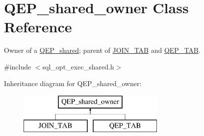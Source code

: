 \hypertarget{classQEP__shared__owner}{}\section{Q\+E\+P\+\_\+shared\+\_\+owner Class Reference}
\label{classQEP__shared__owner}


Owner of a \mbox{\hyperlink{classQEP__shared}{Q\+E\+P\+\_\+shared}}; parent of \mbox{\hyperlink{classJOIN__TAB}{J\+O\+I\+N\+\_\+\+T\+AB}} and \mbox{\hyperlink{classQEP__TAB}{Q\+E\+P\+\_\+\+T\+AB}}.  




{\ttfamily \#include $<$sql\+\_\+opt\+\_\+exec\+\_\+shared.\+h$>$}

Inheritance diagram for Q\+E\+P\+\_\+shared\+\_\+owner\+:\begin{figure}[H]
\begin{center}
\leavevmode
\includegraphics[height=2.000000cm]{classQEP__shared__owner}
\end{center}
\end{figure}
